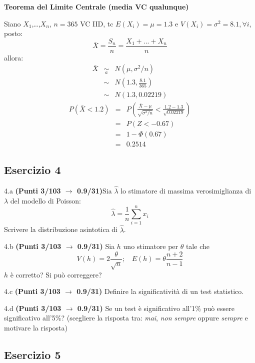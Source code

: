 \documentclass[
  11pt,
]{book}
\theoremstyle{mytheoremstyle}
\theoremstyle{mydefstyle}
\newenvironment{sol}
  {
  \begin{tcolorbox}[enhanced,breakable,arc=0.1mm,boxrule=1pt,colback=white,colframe=iblue,
  title=\bf \fontfamily{lmss}\selectfont \hspace{.5 cm} Soluzione,drop fuzzy shadow]

}{
\end{tcolorbox}
  }
\begin{document}
\begin{sol}
\textbf{Teorema del Limite Centrale (media VC qualunque)}

Siano \(X_1\),\ldots,\(X_n\), \(n=365\) VC IID, tc \(E(X_i)=\mu=1.3\) e \(V(X_i)=\sigma^2=8.1,\forall i\), posto:
\[
      \bar X=\frac{S_n}n =\frac{X_1 + ... + X_n}n
      \]
allora:\begin{eqnarray*}
  \bar X & \mathop{\sim}\limits_{a}& N(\mu,\sigma^2/n) \\
     &\sim & N\left(1.3,\frac{8.1}{365}\right) \\
     &\sim & N(1.3,0.02219)
  \end{eqnarray*}\begin{eqnarray*}
      P( \bar X   <   1.2 ) 
        &=& P\left(  \frac { \bar X  -  \mu }{ \sqrt{\sigma^2/n} }  <  \frac { 1.2  -  1.3 }{\sqrt{ 0.02219 }} \right)  \\
                 &=& P\left(  Z   <   -0.67 \right) \\    
                 &=&  1-\Phi( 0.67 ) \\ &=&  0.2514 
      \end{eqnarray*}

\end{sol}

\subsection{Esercizio 4}\label{esercizio-4-28}

4.a \textbf{(Punti 3/103 \(\rightarrow\) 0.9/31)}Sia \(\hat \lambda\) lo stimatore di massima verosimiglianza di \(\lambda\) del modello di Poisson:
\[\hat\lambda =  \frac 1n\sum_{i=1}^nx_i\]
Scrivere la distribuzione asintotica di \(\hat \lambda\).

4.b \textbf{(Punti 3/103 \(\rightarrow\) 0.9/31)} Sia \(h\) uno stimatore per \(\theta\) tale che
\[V(h)=2\frac\theta {\sqrt{n}};~~~~E(h)=\theta\frac{n+2}{n-1}\]
\(h\) è corretto? Si può correggere?

4.c \textbf{(Punti 3/103 \(\rightarrow\) 0.9/31)} Definire la significatività di un test statistico.

4.d \textbf{(Punti 3/103 \(\rightarrow\) 0.9/31)} Se un test è significativo all'1\% può essere significativo all'5\%? (scegliere la risposta tra: \emph{mai}, \emph{non sempre} oppure \emph{sempre} e motivare la risposta)

\subsection{Esercizio 5}\label{esercizio-5-27}
\end{document}
